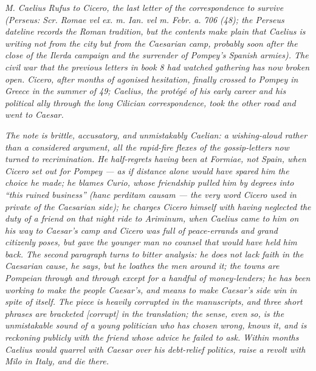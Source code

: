 
\textit{M. Caelius Rufus to Cicero, the last letter of the
correspondence to survive (Perseus: \textit{Scr. Romae vel
ex. m. Ian. vel m. Febr. a. 706 (48)}; the Perseus dateline
records the Roman tradition, but the contents make plain
that Caelius is writing not from the city but from the
Caesarian camp, probably soon after the close of the Ilerda
campaign and the surrender of Pompey's Spanish armies). The
civil war that the previous letters in book 8 had watched
gathering has now broken open. Cicero, after months of
agonised hesitation, finally crossed to Pompey in Greece in
the summer of 49; Caelius, the protégé of his early career
and his political ally through the long Cilician
correspondence, took the other road and went to Caesar.}

\textit{The note is brittle, accusatory, and unmistakably
Caelian: a wishing-aloud rather than a considered argument,
all the rapid-fire flexes of the gossip-letters now turned
to recrimination. He half-regrets having been at Formiae,
not Spain, when Cicero set out for Pompey --- as if
distance alone would have spared him the choice he made;
he blames Curio, whose friendship pulled him by degrees
into ``this ruined business'' (\textit{hanc perditam causam}
--- the very word Cicero used in private of the Caesarian
side); he charges Cicero himself with having neglected the
duty of a friend on that night ride to Ariminum, when
Caelius came to him on his way to Caesar's camp and Cicero
was full of peace-errands and grand citizenly poses, but
gave the younger man no counsel that would have held him
back. The second paragraph turns to bitter analysis: he
does not lack faith in the Caesarian cause, he says, but
he loathes the men around it; the towns are Pompeian
through and through except for a handful of money-lenders;
he has been working to make the people Caesar's, and means
to make Caesar's side win in spite of itself. The piece is
heavily corrupted in the manuscripts, and three short
phrases are bracketed [corrupt] in the translation; the
sense, even so, is the unmistakable sound of a young
politician who has chosen wrong, knows it, and is reckoning
publicly with the friend whose advice he failed to ask.
Within months Caelius would quarrel with Caesar over his
debt-relief politics, raise a revolt with Milo in Italy,
and die there.}
